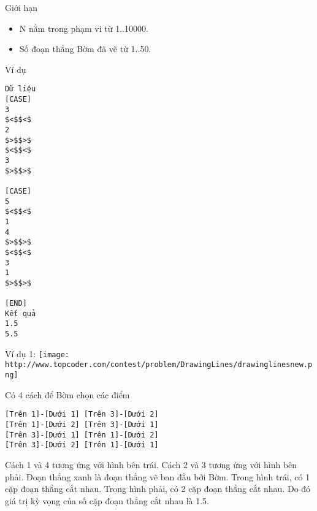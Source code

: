 Giới hạn
\begin{itemize}
	\item     N nằm trong phạm vi từ 1..10000.   
	\item     Số đoạn thẳng Bờm đã vẽ từ 1..50.   
\end{itemize}
Ví dụ
\begin{verbatim}
Dữ liệu
[CASE]
3
$<$$<$
2
$>$$>$
$<$$<$
3
$>$$>$

[CASE]
5
$<$$<$
1
4
$>$$>$
$<$$<$
3
1
$>$$>$

[END]
Kết quả
1.5
5.5
\end{verbatim}

   Ví dụ 1:  
\texttt{[image: http://www.topcoder.com/contest/problem/DrawingLines/drawinglinesnew.png]}

   Có 4 cách để Bờm chọn các điểm  
\begin{verbatim}
[Trên 1]-[Dưới 1] [Trên 3]-[Dưới 2]
[Trên 1]-[Dưới 2] [Trên 3]-[Dưới 1]
[Trên 3]-[Dưới 1] [Trên 1]-[Dưới 2]
[Trên 3]-[Dưới 2] [Trên 1]-[Dưới 1]
\end{verbatim}

   Cách 1 và 4 tương ứng với hình bên trái. Cách 2 và 3 tương ứng với hình bên phải. Đoạn thẳng xanh là đoạn thẳng vẽ ban đầu bởi Bờm. Trong hình trái, có 1 cặp đoạn thẳng cắt nhau. Trong hình phải, có 2 cặp đoạn thẳng cắt nhau. Do đó giá trị kỳ vọng của số cặp đoạn thẳng cắt nhau là 1.5.